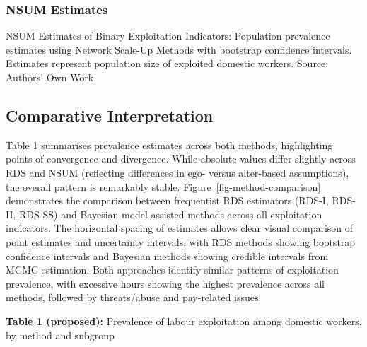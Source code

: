 \documentclass[
  12pt,
  letterpaper,
  DIV=11,
  numbers=noendperiod]{scrartcl}
\theoremstyle{plain}
\theoremstyle{definition}
\begin{document}
\subsubsection{NSUM Estimates}\label{nsum-estimates}

\begin{table}

\caption{\label{tbl-nsum-binary-indicators}NSUM Estimates of Binary
Exploitation Indicators: Population prevalence estimates using Network
Scale-Up Methods with bootstrap confidence intervals. Estimates
represent population size of exploited domestic workers. Source:
Authors' Own Work.}


\end{table}%

\subsection{Comparative
Interpretation}\label{comparative-interpretation}

Table 1 summarises prevalence estimates across both methods,
highlighting points of convergence and divergence. While absolute values
differ slightly across RDS and NSUM (reflecting differences in ego-
versus alter-based assumptions), the overall pattern is remarkably
stable. Figure~\ref{fig-method-comparison} demonstrates the comparison
between frequentist RDS estimators (RDS-I, RDS-II, RDS-SS) and Bayesian
model-assisted methods across all exploitation indicators. The
horizontal spacing of estimates allows clear visual comparison of point
estimates and uncertainty intervals, with RDS methods showing bootstrap
confidence intervals and Bayesian methods showing credible intervals
from MCMC estimation. Both approaches identify similar patterns of
exploitation prevalence, with excessive hours showing the highest
prevalence across all methods, followed by threats/abuse and pay-related
issues.

\textbf{Table 1 (proposed):} Prevalence of labour exploitation among
domestic workers, by method and subgroup
\end{document}
